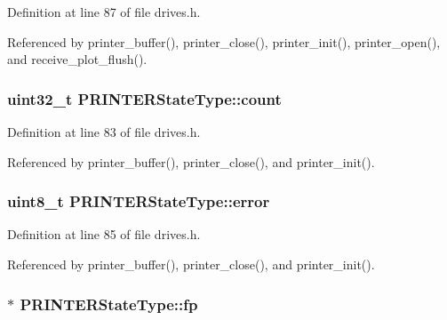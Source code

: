 Definition at line 87 of file drives.\+h.



Referenced by printer\+\_\+buffer(), printer\+\_\+close(), printer\+\_\+init(), printer\+\_\+open(), and receive\+\_\+plot\+\_\+flush().

\subsubsection[{\texorpdfstring{count}{count}}]{\setlength{\rightskip}{0pt plus 5cm}uint32\+\_\+t P\+R\+I\+N\+T\+E\+R\+State\+Type\+::count}\hypertarget{structPRINTERStateType_ae115fc351910f3801e37b31f254fb8f4}{}\label{structPRINTERStateType_ae115fc351910f3801e37b31f254fb8f4}


Definition at line 83 of file drives.\+h.



Referenced by printer\+\_\+buffer(), printer\+\_\+close(), and printer\+\_\+init().

\subsubsection[{\texorpdfstring{error}{error}}]{\setlength{\rightskip}{0pt plus 5cm}uint8\+\_\+t P\+R\+I\+N\+T\+E\+R\+State\+Type\+::error}\hypertarget{structPRINTERStateType_a6e5b550f5396901febd5475445132dd0}{}\label{structPRINTERStateType_a6e5b550f5396901febd5475445132dd0}


Definition at line 85 of file drives.\+h.



Referenced by printer\+\_\+buffer(), printer\+\_\+close(), and printer\+\_\+init().

\subsubsection[{\texorpdfstring{fp}{fp}}]{$\ast$ P\+R\+I\+N\+T\+E\+R\+State\+Type\+::fp}\hypertarget{structPRINTERStateType_a791c78d68d169f9d2e60d34b890e520a}{}\label{structPRINTERStateType_a791c78d68d169f9d2e60d34b890e520a}


